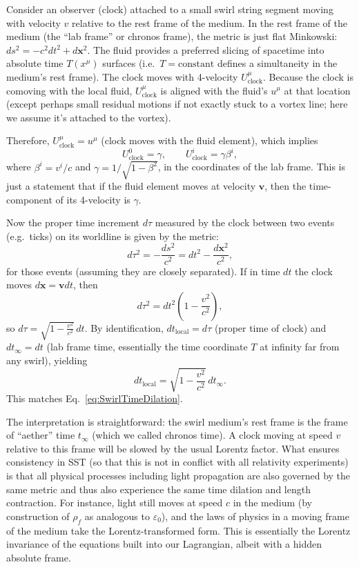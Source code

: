 \documentclass[10pt,reprint,aps,onecolumn,nofootinbib]{revtex4-2}
\newcommand{\rhoF}{\rho_{\!f}}     %
\begin{document}
Consider an observer (clock) attached to a small swirl string segment moving with velocity $v$ relative to the rest frame of the medium. In the rest frame of the medium (the “lab frame” or chronos frame), the metric is just flat Minkowski: $ds^2 = -c^2 dt^2 + d\mathbf{x}^2$. The fluid provides a preferred slicing of spacetime into absolute time $T(x^\mu)$ surfaces (i.e.\ $T= \text{constant}$ defines a simultaneity in the medium’s rest frame). The clock moves with 4-velocity $U^\mu_{\text{clock}}$. Because the clock is comoving with the local fluid, $U^\mu_{\text{clock}}$ is aligned with the fluid’s $u^\mu$ at that location (except perhaps small residual motions if not exactly stuck to a vortex line; here we assume it’s attached to the vortex).

Therefore, $U^\mu_{\text{clock}} = u^\mu$ (clock moves with the fluid element), which implies
\begin{equation}
U^0_{\text{clock}} = \gamma, \qquad U^i_{\text{clock}} = \gamma \beta^i,
\end{equation}
where $\beta^i = v^i/c$ and $\gamma = 1/\sqrt{1-\beta^2}$, in the coordinates of the lab frame. This is just a statement that if the fluid element moves at velocity $\mathbf{v}$, then the time-component of its 4-velocity is $\gamma$.

Now the proper time increment $d\tau$ measured by the clock between two events (e.g.\ ticks) on its worldline is given by the metric:
\begin{equation}
d\tau^2 = -\frac{ds^2}{c^2} = dt^2 - \frac{d\mathbf{x}^2}{c^2},
\end{equation}
for those events (assuming they are closely separated). If in time $dt$ the clock moves $d\mathbf{x} = \mathbf{v} dt$, then
\begin{equation*}
d\tau^2 = dt^2 \left(1 - \frac{v^2}{c^2}\right),
\end{equation*}
so $d\tau = \sqrt{1-\frac{v^2}{c^2}}\, dt$. By identification, $dt_{\text{local}} = d\tau$ (proper time of clock) and $dt_{\infty} = dt$ (lab frame time, essentially the time coordinate $T$ at infinity far from any swirl), yielding
\begin{equation}
dt_{\text{local}} = \sqrt{1-\frac{v^2}{c^2}}\, dt_{\infty}.
\end{equation}
This matches Eq.~\eqref{eq:SwirlTimeDilation}.

The interpretation is straightforward: the swirl medium’s rest frame is the frame of “aether” time $t_{\infty}$ (which we called chronos time). A clock moving at speed $v$ relative to this frame will be slowed by the usual Lorentz factor. What ensures consistency in SST (so that this is not in conflict with all relativity experiments) is that all physical processes including light propagation are also governed by the same metric and thus also experience the same time dilation and length contraction. For instance, light still moves at speed $c$ in the medium (by construction of $\rhoF$ as analogous to $\varepsilon_0$), and the laws of physics in a moving frame of the medium take the Lorentz-transformed form. This is essentially the Lorentz invariance of the equations built into our Lagrangian, albeit with a hidden absolute frame.
\end{document}
